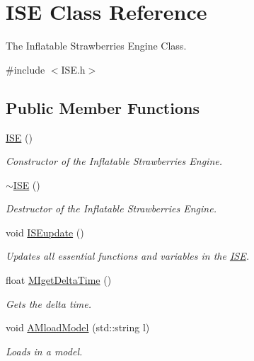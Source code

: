 \hypertarget{class_i_s_e}{\section{I\-S\-E Class Reference}
\label{class_i_s_e}
}


The Inflatable Strawberries Engine Class.  




{\ttfamily \#include $<$I\-S\-E.\-h$>$}

\subsection*{Public Member Functions}
\begin{DoxyCompactItemize}
\item 
\hyperlink{class_i_s_e_ac6e95e7cdeb42d27851f8027aa5dc895}{I\-S\-E} ()
\begin{DoxyCompactList}\small\item\em Constructor of the Inflatable Strawberries Engine. \end{DoxyCompactList}\item 
\hyperlink{class_i_s_e_a05e588ddcd62560c540f5ecf2132546b}{$\sim$\-I\-S\-E} ()
\begin{DoxyCompactList}\small\item\em Destructor of the Inflatable Strawberries Engine. \end{DoxyCompactList}\item 
void \hyperlink{class_i_s_e_af6de6ea731783192c5657a9148561871}{I\-S\-Eupdate} ()
\begin{DoxyCompactList}\small\item\em Updates all essential functions and variables in the \hyperlink{class_i_s_e}{I\-S\-E}. \end{DoxyCompactList}\item 
float \hyperlink{class_i_s_e_acdd404a57871611a26bef342f099d0a1}{M\-Iget\-Delta\-Time} ()
\begin{DoxyCompactList}\small\item\em Gets the delta time. \end{DoxyCompactList}\item 
void \hyperlink{class_i_s_e_ae4a785680eecc677a8c3b8e25d46e3e3}{A\-Mload\-Model} (std\-::string l)
\begin{DoxyCompactList}\small\item\em Loads in a model. \end{DoxyCompactList}\item 

\end{DoxyCompactItemize}

